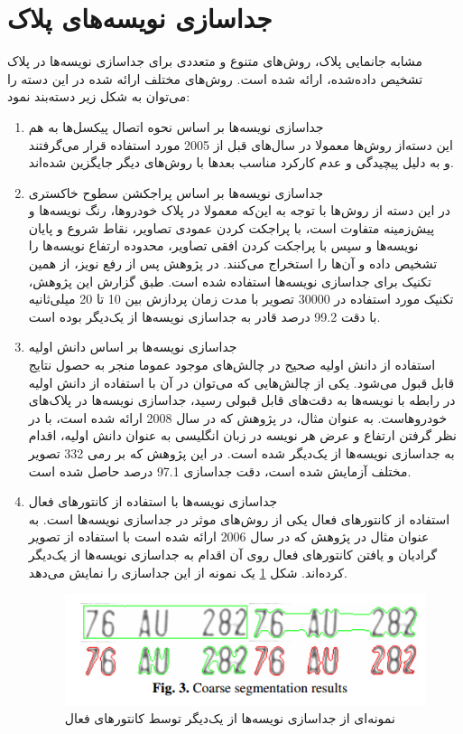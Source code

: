 \documentclass[12pt,a4paper]{article}
\begin{document}
\section{جداسازی نویسه‌های پلاک}
مشابه جانمایی پلاک، روش‌های متنوع و متعددی برای جداسازی نویسه‌ها در پلاک تشخیص‌ داده‌شده، ارائه شده است. روش‌های مختلف ارائه شده در این دسته را می‌توان به شکل زیر دسته‌بند نمود:
\begin{enumerate}
\item جداسازی نویسه‌ها بر اساس نحوه اتصال پیکسل‌ها به هم \\
این دسته‌از روش‌ها معمولا در سال‌های قبل از 2005 مورد استفاده قرار می‌گرفتند و به دلیل پیچیدگی و عدم کارکرد مناسب بعدها با روش‌های دیگر جایگزین شده‌اند.
\item جداسازی نویسه‌ها بر اساس پراجکشن سطوح خاکستری \\
در این دسته از روش‌ها با توجه به این‌که معمولا در پلاک خودروها، رنگ نویسه‌ها و پیش‌زمینه متفاوت است، با پراجکت کردن عمودی تصاویر، نقاط شروع و پایان نویسه‌ها و سپس با پراجکت کردن افقی تصاویر، محدوده ارتفاع نویسه‌ها را تشخیص داده و آن‌ها را استخراج می‌کنند. در پژوهش \cite{sanyuan2004car} پس از رفع نویز، از همین تکنیک برای جداسازی نویسه‌ها استفاده شده است. طبق گزارش این پژوهش، تکنیک مورد استفاده در 30000 تصویر با مدت زمان پردازش بین 10 تا 20 میلی‌ثانیه با دقت 99.2 درصد قادر به جداسازی نویسه‌ها از یک‌دیگر بوده است.
\item جداسازی نویسه‌ها بر اساس دانش اولیه \\
استفاده از دانش اولیه صحیح در چالش‌های موجود عموما منجر به حصول نتایج قابل قبول می‌شود. یکی از چالش‌هایی که می‌توان در آن با استفاده از دانش اولیه در رابطه با نویسه‌ها به دقت‌های قابل قبولی رسید، جداسازی نویسه‌ها در پلاک‌های خودروهاست. به عنوان مثال، در پژوهش \cite{guo2008license} که در سال 2008 ارائه شده است، با در نظر گرفتن ارتفاع و عرض هر نویسه در زبان انگلیسی به عنوان دانش اولیه، اقدام به جداسازی نویسه‌ها از یک‌دیگر شده است. در این پژوهش که بر رمی 332 تصویر مختلف آزمایش شده است، دقت جداسازی 97.1 درصد حاصل شده است.
\item جداسازی نویسه‌ها با استفاده از کانتورهای فعال \\
استفاده از کانتورهای فعال یکی از روش‌های موثر در جداسازی نویسه‌ها است. به عنوان مثال در پژوهش \cite{capar2006concurrent} که در سال 2006 ارائه شده است با استفاده از تصویر گرادیان و یافتن کانتورهای فعال روی آن اقدام به جداسازی نویسه‌ها از یک‌دیگر کرده‌اند. شکل \ref{fig:seg1} یک نمونه از این جداسازی را نمایش می‌دهد.


\begin{figure}[h]
\centering
\includegraphics[scale=0.5]{Imgs/seg1.png}
\caption{نمونه‌ای از جداسازی نویسه‌ها از یک‌دیگر توسط کانتورهای فعال \cite{capar2006concurrent}}
\label{fig:seg1}
\end{figure}

\end{enumerate}
\end{document}
